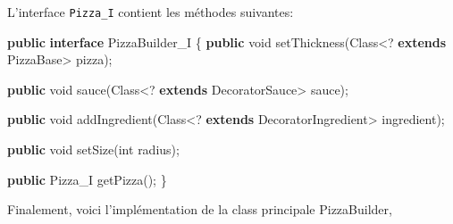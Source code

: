\documentclass[french,]{article}
\newenvironment{Shaded}{}{}
\newcommand{\KeywordTok}[1]{\textcolor[rgb]{0.00,0.44,0.13}{\textbf{{#1}}}}
\newcommand{\DataTypeTok}[1]{\textcolor[rgb]{0.56,0.13,0.00}{{#1}}}
\newcommand{\FunctionTok}[1]{\textcolor[rgb]{0.02,0.16,0.49}{{#1}}}
\newcommand{\NormalTok}[1]{{#1}}
\begin{document}
L'interface \texttt{Pizza\_I} contient les méthodes suivantes:

\begin{Shaded}
\begin{Highlighting}[]
\KeywordTok{public} \KeywordTok{interface} \NormalTok{PizzaBuilder_I \{}
    \KeywordTok{public} \DataTypeTok{void} \FunctionTok{setThickness}\NormalTok{(Class<? }\KeywordTok{extends} \NormalTok{PizzaBase> pizza);}

    \KeywordTok{public} \DataTypeTok{void} \FunctionTok{sauce}\NormalTok{(Class<? }\KeywordTok{extends} \NormalTok{DecoratorSauce> sauce);}

    \KeywordTok{public} \DataTypeTok{void} \FunctionTok{addIngredient}\NormalTok{(Class<? }\KeywordTok{extends} \NormalTok{DecoratorIngredient> ingredient);}

    \KeywordTok{public} \DataTypeTok{void} \FunctionTok{setSize}\NormalTok{(}\DataTypeTok{int} \NormalTok{radius);}

    \KeywordTok{public} \NormalTok{Pizza_I }\FunctionTok{getPizza}\NormalTok{();}
\NormalTok{\}}
\end{Highlighting}
\end{Shaded}

Finalement, voici l'implémentation de la class principale PizzaBuilder,
\end{document}
